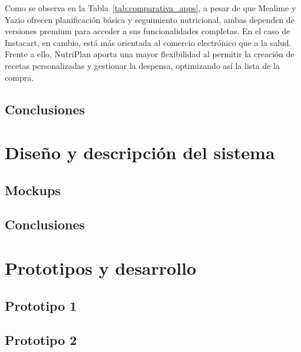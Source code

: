 \documentclass[twoside, openright, 11pt]{report}
\begin{document}
  Como se observa en la Tabla~\ref{tab:comparativa_apps}, a pesar de que Mealime y Yazio ofrecen planificación básica y seguimiento nutricional, ambas dependen de versiones premium para acceder a sus funcionalidades completas. En el caso de Instacart, en cambio, está más orientada al comercio electrónico que a la salud. Frente a ello, NutriPlan aporta una mayor flexibilidad al permitir la creación de recetas personalizadas y gestionar la despensa, optimizando así la lista de la compra.

  \section{Conclusiones}

\chapter{Diseño y descripción del sistema}\label{cap.diseno y descripcion del sistema} %
  \section{Mockups}
  
  \section{Conclusiones}

\chapter{Prototipos y desarrollo}\label{cap.prototipos y desarrollo}
  \section{Prototipo 1}
  \section{Prototipo 2}
\end{document}

